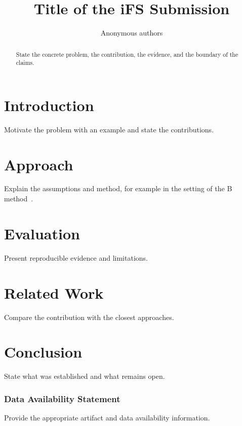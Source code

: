 \documentclass[runningheads,orivec]{llncs}
\title{Title of the iFS Submission}
\author{Anonymous authors}
\institute{Anonymous institution}
\begin{document}
\maketitle
\begin{abstract}
State the concrete problem, the contribution, the evidence, and the
boundary of the claims.
\end{abstract}
\section{Introduction}
Motivate the problem with an example and state the contributions.
\section{Approach}
Explain the assumptions and method, for example in the setting of the
B method~\cite{AbrialBBook}.
\section{Evaluation}
Present reproducible evidence and limitations.
\section{Related Work}
Compare the contribution with the closest approaches.
\section{Conclusion}
State what was established and what remains open.
\subsubsection*{Data Availability Statement}
Provide the appropriate artifact and data availability information.


\end{document}
